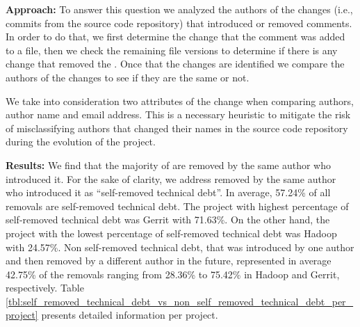 \vspace{1mm}
\noindent \textbf{Approach:} To answer this question we analyzed the authors of the changes (i.e., commits from the source code repository) that introduced or removed \SATD comments. In order to do that, we first determine the change that the \SATD comment was added to a file, then we check the remaining file versions to determine if there is any change that removed the \SATD. Once that the changes are identified we compare the authors of the changes to see if they are the same or not. 

We take into consideration two attributes of the change when comparing authors, author name and email address. This is a necessary heuristic to mitigate the risk of misclassifying authors that changed their names in the source code repository during the evolution of the project.  

\vspace{1mm}
\noindent \textbf{Results:} We find that the majority of \SATD are removed by the same author who introduced it. For the sake of clarity, we address \SATD removed by the same author who introduced it as ``self-removed technical debt''. In average, 57.24\% of all removals are self-removed technical debt. The project with highest percentage of self-removed technical debt was Gerrit with 71.63\%. On the other hand, the project with the lowest percentage of self-removed technical debt was Hadoop with 24.57\%.  Non self-removed technical debt, \SATD that was introduced by one author and then removed by a different author in the future, represented in average 42.75\% of the removals ranging from 28.36\% to 75.42\% in Hadoop and Gerrit, respectively. Table \ref{tbl:self_removed_technical_debt_vs_non_self_removed_technical_debt_per_project} presents detailed information per project.

